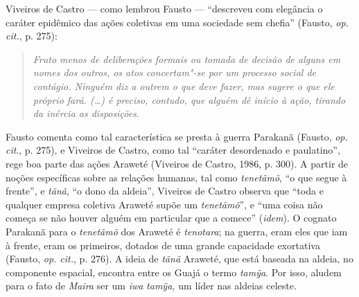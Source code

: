 Viveiros de Castro --- como lembrou Fausto --- ``descreveu com elegância o
caráter epidêmico das ações coletivas em uma sociedade sem chefia''
(Fausto, \emph{op. cit.}, p. 275):

\begin{quote}
\emph{Fruto menos de deliberações formais ou tomada de decisão de alguns em
nomes dos outros, os atos concertam"-se por um processo social de
contágio. Ninguém diz a outrem o que deve fazer, mas sugere o que ele
próprio fará. (\ldots{}) é preciso, contudo, que alguém dê início à ação,
tirando da inércia as disposições}.
\end{quote}

Fausto comenta como tal característica se presta à guerra Parakanã
(Fausto, \emph{op. cit}., p. 275), e Viveiros de Castro, como tal ``caráter
desordenado e paulatino'', rege boa parte das ações Araweté (Viveiros de
Castro, 1986, p. 300). A partir de noções específicas sobre as relações
humanas, tal como \emph{tenetãmõ}, ``o que segue à frente'', e
\emph{tãnã}, ``o dono da aldeia'', Viveiros de Castro observa que ``toda e
qualquer empresa coletiva Araweté supõe um \emph{tenetãmõ}'', e ``uma
coisa não começa se não houver alguém em particular que a comece''
(\emph{idem}). O cognato Parakanã para o \emph{tenetãmõ} dos Araweté é
\emph{tenotara}; na guerra, eram eles que iam à frente, eram os
primeiros, dotados de uma grande capacidade exortativa (Fausto, \emph{op.
cit.}, p. 276). A ideia de \emph{tãnã} Araweté, que está baseada na
aldeia, no componente espacial, encontra entre os Guajá o termo
\emph{tamỹa}. Por isso, aludem para o fato de \emph{Maira} ser um
\emph{iwa} \emph{tamỹa,} um líder nas aldeias celeste.


